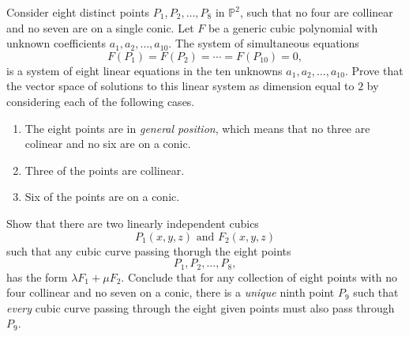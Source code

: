 \begin{tcolorbox}[title=Problem 11, breakable]
    Consider eight distinct points $P_1, P_2, \ldots, P_8$ in $\mathbb{P}^2$,
    such that no four are collinear and no seven are on a single conic.
    Let $F$ be a generic cubic polynomial with unknown coefficients
    $a_1, a_2, \ldots, a_{10}$. The system of simultaneous equations 
    \[F(P_1) = F(P_2) = \cdots = F(P_{10}) = 0,\]
    is a system of eight linear equations in the ten unknowns $a_1, a_2, \ldots, a_{10}$.
    Prove that the vector space of solutions to this linear system as dimension equal to $2$
    by considering each of the following cases.
    \begin{enumerate}
        \item The eight points are in \emph{general position}, which means that no three 
        are colinear and no six are on a conic.
        \item Three of the points are collinear.
        \item Six of the points are on a conic.
    \end{enumerate}
\end{tcolorbox}


\begin{tcolorbox}[title=Problem 12, breakable]
    Show that there are two linearly independent cubics 
    \[P_1(x, y, z) \text{ and } F_2(x, y, z)\]
    such that any cubic curve passing thorugh the eight points 
    \[P_1, P_2, \ldots, P_8,\]
    has the form $\lambda F_1 + \mu F_2$. Conclude that 
    for any collection of eight points with no four collinear and no 
    seven on a conic, there is a \emph{unique} ninth point $P_9$
    such that \emph{every} cubic curve passing through the 
    eight given points must also pass through $P_9$.
\end{tcolorbox}

